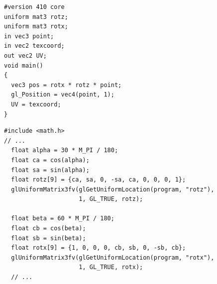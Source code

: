 \documentclass[calcdimensions,landscape,letterpaper]{powersem}
\newcommand{\thecurrentheading}{}
\newcommand{\heading}[1]{\renewcommand{\thecurrentheading}{#1}}
\begin{document}
\begin{slide}
    \heading{3D Rotations}
    \begin{center}
        \begin{minipage}[c]{.5\textwidth}
            \begin{verbatim}
#version 410 core
uniform mat3 rotz;
uniform mat3 rotx;
in vec3 point;
in vec2 texcoord;
out vec2 UV;
void main()
{
  vec3 pos = rotx * rotz * point;
  gl_Position = vec4(point, 1);
  UV = texcoord;
}
            \end{verbatim}
        \end{minipage}
    \end{center}
\end{slide}

\begin{slide}
    \heading{Uniform Rotation Matrices}
    \begin{center}
        \begin{minipage}[c]{.95\textwidth}
            \begin{verbatim}
#include <math.h>
// ...
  float alpha = 30 * M_PI / 180;
  float ca = cos(alpha);
  float sa = sin(alpha);
  float rotz[9] = {ca, sa, 0, -sa, ca, 0, 0, 0, 1};
  glUniformMatrix3fv(glGetUniformLocation(program, "rotz"),
                     1, GL_TRUE, rotz);

  float beta = 60 * M_PI / 180;
  float cb = cos(beta);
  float sb = sin(beta);
  float rotx[9] = {1, 0, 0, 0, cb, sb, 0, -sb, cb};
  glUniformMatrix3fv(glGetUniformLocation(program, "rotx"),
                     1, GL_TRUE, rotx);
  // ...
            \end{verbatim}
        \end{minipage}
    \end{center}
\end{slide}
\end{document}
